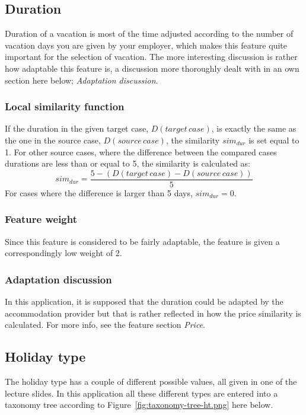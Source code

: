 \documentclass[12pt]{article}
\begin{document}
\subsection{Duration}

Duration of a vacation is most of the time adjusted according to the number of vacation days you are given by your employer, which makes this feature quite important for the selection of vacation. The more interesting discussion is rather how adaptable this feature is, a discussion more thoroughly dealt with in an own section here below; \textit{Adaptation discussion}.

\subsubsection{Local similarity function}

If the duration in the given target case, $D(target\,case)$, is exactly the same as the one in the source case, $D(source\,case)$, the similarity $sim_{dur}$ is set equal to 1. For other source cases, where the difference between the compared cases durations are less than or equal to 5, the similarity is calculated as: $$sim_{dur}=\frac{5-(D(target\,case)-D(source\,case))}{5}$$
For cases where the difference is larger than 5 days, $sim_{dur}=0$.

\subsubsection{Feature weight}

Since this feature is considered to be fairly adaptable, the feature is given a correspondingly low weight of 2. 

\subsubsection{Adaptation discussion}

In this application, it is supposed that the duration could be adapted by the accommodation provider but that is rather reflected in how the price similarity is calculated. For more info, see the feature section \textit{Price}. 

\subsection{Holiday type}

The holiday type has a couple of different possible values, all given in one of the lecture slides. In this application all these different types are entered into a taxonomy tree according to Figure~\ref{fig:taxonomy-tree-ht.png} here below.
\end{document}
